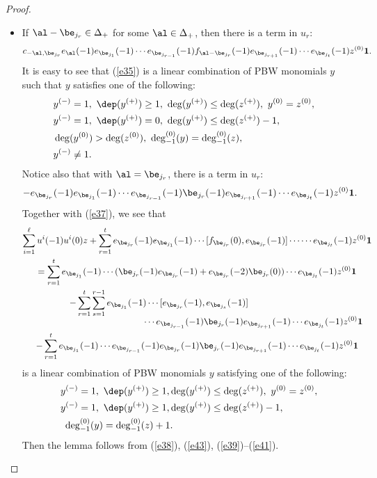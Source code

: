 \begin{proof}
\begin{itemize}
\item
If $\al-\be_{j_r}\in\Delta_+$ for some $\al\in\Delta_+$, then there is a term in $u_r$:
\begin{equation}\label{e35}
c_{-\al,\be_{j_r}}e_{\al}(-1)e_{\be_{j_1}}(-1) \cdots e_{\be_{j_{r-1}}}(-1) f_{\al-\be_{j_r}}(-1)e_{\be_{j_{r+1}}}(-1) \cdots e_{\be_{j_t}}(-1) z^{(0)} \mathbf{1}.
\end{equation}
It is easy to see that (\ref{e35}) is a linear combination of PBW monomials $y$ such that $y$ satisfies one of the following:
\begin{align}\label{e39}
& y^{(-)}=1, \ \dep(y^{(+)})\geq 1, \ \deg(y^{(+)})\leq \deg(z^{(+)}), \ y^{(0)}=z^{(0)},&\\
& y^{(-)}=1, \ \dep(y^{(+)})=0, \ \deg(y^{(+)})\leq \deg(z^{(+)})-1, &\\ \nonumber & \deg(y^{(0)})>\deg(z^{(0)}), \ \deg_{-1}^{(0)}(y)=\deg_{-1}^{(0)}(z),&\\
& y^{(-)}\neq 1.
\end{align}
Notice also that with $\al=\be_{j_r}$, there is a term in $u_r$:
\begin{equation*}
-e_{\be_{j_r}}(-1)e_{\be_{j_1}}(-1) \cdots e_{\be_{j_{r-1}}}(-1)
\be_{j_r}(-1)e_{\be_{j_{r+1}}}(-1) \cdots e_{\be_{j_t}}(-1) z^{(0)} \mathbf{1}.
\end{equation*}
Together with (\ref{e37}), we see that
\begin{multline*}
\sum_{i=1}^{\ell} u^i(-1)u^i(0) z+\sum_{r=1}^te_{\be_{j_r}}(-1)e_{\be_{j_1}}(-1)\cdots [f_{\be_{j_r}}(0), e_{\be_{j_r}}(-1)]\cdots \cdots e_{\be_{j_t}}(-1) z^{(0)} \mathbf{1}\\
= \sum_{r=1}^t
e_{\be_{j_1}}(-1) \cdots (\be_{j_r}(-1) e_{\be_{j_r}}(-1) + e_{\be_{j_r}}(-2) \be_{j_r}(0)) \cdots e_{\be_{j_t}}(-1) z^{(0)} \mathbf{1}\\
\hspace*{-3cm}-\sum_{r=1}^t\sum_{s=1}^{r-1}e_{\be_{j_1}}(-1) \cdots [e_{\be_{j_r}}(-1), e_{\be_{j_s}}(-1)]\\[-5pt]
\shoveright{\cdots e_{\be_{j_{r-1}}}(-1)\be_{j_r}(-1)e_{\be_{j_{r+1}}}(-1) \cdots e_{\be_{j_t}}(-1) z^{(0)} \mathbf{1}}\\
-\sum_{r=1}^te_{\be_{j_1}}(-1) \cdots e_{\be_{j_{r-1}}}(-1)e_{\be_{j_r}}(-1)\be_{j_r}(-1)e_{\be_{j_{r+1}}}(-1) \cdots e_{\be_{j_t}}(-1) z^{(0)} \mathbf{1}
\end{multline*}
is a linear combination of PBW monomials $y$ satisfying one of the following:
\begin{align}
\label{e40}
& y^{(-)}=1, \ \dep(y^{(+)})\geq 1, \deg(y^{(+)})\leq \deg(z^{(+)}), \ y^{(0)}=z^{(0)}, \\\label{e41}
& y^{(-)}=1, \ \dep(y^{(+)})\geq 1, \deg(y^{(+)})\leq \deg(z^{(+)})-1, \\
& \ \deg_{-1}^{(0)}(y)=\deg_{-1}^{(0)}(z)+1. \nonumber
\end{align}
Then the lemma follows from (\ref{e38}), (\ref{e43}), (\ref{e39})--(\ref{e41}).\qedhere
\end{itemize}
\end{proof}

